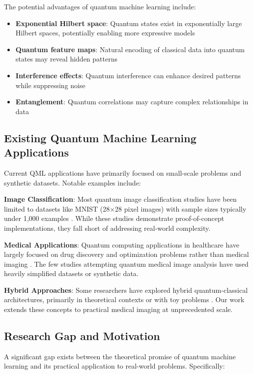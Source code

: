 \documentclass[conference]{IEEEtran}
\begin{document}
The potential advantages of quantum machine learning include:
\begin{itemize}
    \item \textbf{Exponential Hilbert space}: Quantum states exist in exponentially large Hilbert spaces, potentially enabling more expressive models
    \item \textbf{Quantum feature maps}: Natural encoding of classical data into quantum states may reveal hidden patterns
    \item \textbf{Interference effects}: Quantum interference can enhance desired patterns while suppressing noise
    \item \textbf{Entanglement}: Quantum correlations may capture complex relationships in data
\end{itemize}

\subsection{Existing Quantum Machine Learning Applications}

Current QML applications have primarily focused on small-scale problems and synthetic datasets. Notable examples include:

\textbf{Image Classification}: Most quantum image classification studies have been limited to datasets like MNIST (28×28 pixel images) with sample sizes typically under 1,000 examples \cite{henderson2020quanvolutional}. While these studies demonstrate proof-of-concept implementations, they fall short of addressing real-world complexity.

\textbf{Medical Applications}: Quantum computing applications in healthcare have largely focused on drug discovery and optimization problems rather than medical imaging \cite{ruan2017quantum}. The few studies attempting quantum medical image analysis have used heavily simplified datasets or synthetic data.

\textbf{Hybrid Approaches}: Some researchers have explored hybrid quantum-classical architectures, primarily in theoretical contexts or with toy problems \cite{schuld2020circuit}. Our work extends these concepts to practical medical imaging at unprecedented scale.

\subsection{Research Gap and Motivation}

A significant gap exists between the theoretical promise of quantum machine learning and its practical application to real-world problems. Specifically:
\end{document}
